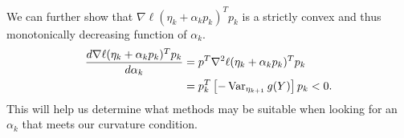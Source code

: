 We can further show that $\nabla \ell( \eta_k + \alpha_k p_k)^T p_k$ is a strictly convex and thus monotonically decreasing function of $\alpha_k$.    
\begin{align*}
	\frac{d  \nabla \ell( \eta_k + \alpha_k p_k )^T p_k }{d \alpha_k} &= p^T \nabla^2 \ell ( \eta_k + \alpha_k p_k )^T p_k \\
	&= p_k^T \left [ - \operatorname{Var}_{\eta_{k+1}} g(Y) \right ] p_k
	< 0.
\end{align*}
This will help us determine what methods may be suitable when looking for an $\alpha_k$ that meets our curvature condition.



